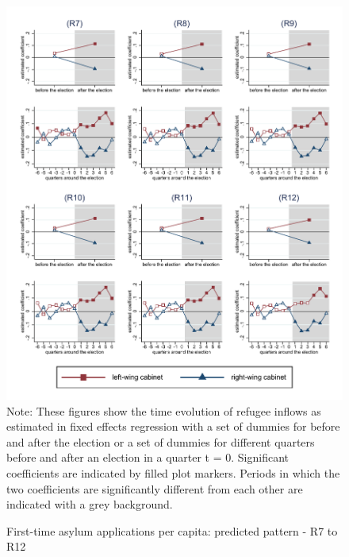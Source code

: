 \documentclass[11pt,a4paper]{scrartcl}
\begin{document}
\clearpage
\FloatBarrier


\clearpage
\FloatBarrier
\begin{figure}[!ht]
	\caption{First-time asylum applications per capita: predicted pattern - R7 to R12}
	\includegraphics[width=1\textwidth]{../results/applications/app_graphs_R7-R12.pdf}
	\scriptsize{Note: These figures show the time evolution of refugee inflows as estimated in fixed effects regression
		with a set of dummies for before and after the election or a set of dummies for different quarters before and after an election in a quarter t = 0. Significant coefficients are indicated by filled plot markers. Periods in which the two coefficients are significantly different from each other are indicated with a grey background.}
\end{figure}
%
%
%
%
%
%
%
%
\end{document}
